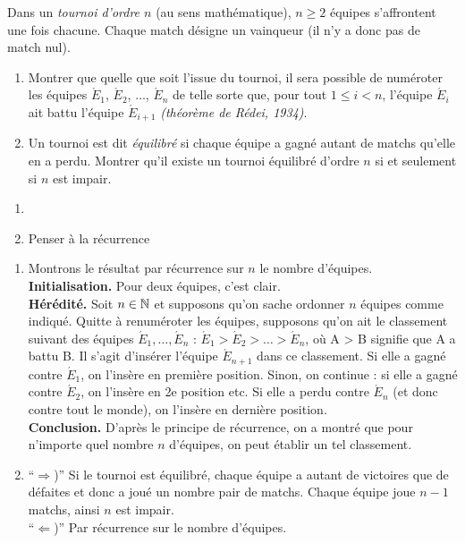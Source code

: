 \begin{exo}

Dans un \emph{tournoi d'ordre $n$} (au sens mathématique), $n \geq 2$ équipes s'affrontent une fois chacune. Chaque match désigne un vainqueur (il n'y a donc pas de match nul).
\begin{enumerate}
\item Montrer que quelle que soit l'issue du tournoi, il sera possible de numéroter les équipes $\acute E_1$, $\acute E_2$, $\ldots$, $\acute E_n$ de telle sorte que, pour tout $1 \leq i < n$, l'équipe $\acute E_i$ ait battu l'équipe $\acute E_{i+1}$ \emph{(théorème de Rédei, 1934)}.
\item Un tournoi est dit \emph{équilibré} si chaque équipe a gagné autant de matchs qu'elle en a perdu. Montrer qu'il existe un tournoi équilibré d'ordre $n$ si et seulement si $n$ est impair.
  \end{enumerate}
\begin{hint}
\begin{enumerate}
\item 
\item Penser à la récurrence
\end{enumerate}
\end{hint}
\begin{sol}
\begin{enumerate}
\item Montrons le résultat par récurrence sur $n$ le nombre d'équipes.\\
\textbf{Initialisation.} Pour deux équipes, c'est clair.\\
\textbf{Hérédité.} Soit $n\in \mathbb N$ et supposons qu'on sache ordonner $n$ équipes comme indiqué. Quitte à renuméroter les équipes, supposons qu'on ait le classement suivant des équipes $\acute E_1,\ldots,\acute
E_n$ : $\acute E_1 > \acute E_2 > \ldots > \acute E_n$, où A > B signifie que A a battu B. Il s'agit d'insérer l'équipe $\acute E_{n+1}$ dans ce classement. Si elle a gagné contre $\acute E_1$, on l'insère en première position. Sinon, on continue : si elle a gagné contre $\acute E_2$, on l'insère en 2e position etc. Si elle a perdu contre $\acute E_n$ (et donc contre tout le monde), on l'insère en dernière position.\\
\textbf{Conclusion.} D'après le principe de récurrence, on a montré que pour n'importe quel nombre $n$ d'équipes, on peut établir un tel classement.\\
\item “$\Rightarrow$)” Si le tournoi est équilibré, chaque équipe a autant de victoires que de défaites et donc a joué un nombre pair de matchs. Chaque équipe joue $n-1$ matchs, ainsi $n$ est impair.\\
“$\Leftarrow$)” Par récurrence sur le nombre d'équipes.
\end{enumerate}
\end{sol}
\end{exo}



